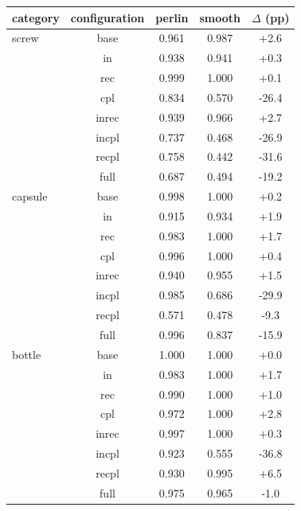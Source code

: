\setlength{\tabcolsep}{3pt}
\begin{tabular}{@{}lcccc@{}}
\toprule
category & configuration & perlin & smooth & $\Delta$ (pp) \\
\midrule
screw & base & 0.961 & 0.987 & +2.6 \\
 & in & 0.938 & 0.941 & +0.3 \\
 & rec & 0.999 & 1.000 & +0.1 \\
 & cpl & 0.834 & 0.570 & -26.4 \\
 & inrec & 0.939 & 0.966 & +2.7 \\
 & incpl & 0.737 & 0.468 & -26.9 \\
 & recpl & 0.758 & 0.442 & -31.6 \\
 & full & 0.687 & 0.494 & -19.2 \\
capsule & base & 0.998 & 1.000 & +0.2 \\
 & in & 0.915 & 0.934 & +1.9 \\
 & rec & 0.983 & 1.000 & +1.7 \\
 & cpl & 0.996 & 1.000 & +0.4 \\
 & inrec & 0.940 & 0.955 & +1.5 \\
 & incpl & 0.985 & 0.686 & -29.9 \\
 & recpl & 0.571 & 0.478 & -9.3 \\
 & full & 0.996 & 0.837 & -15.9 \\
bottle & base & 1.000 & 1.000 & +0.0 \\
 & in & 0.983 & 1.000 & +1.7 \\
 & rec & 0.990 & 1.000 & +1.0 \\
 & cpl & 0.972 & 1.000 & +2.8 \\
 & inrec & 0.997 & 1.000 & +0.3 \\
 & incpl & 0.923 & 0.555 & -36.8 \\
 & recpl & 0.930 & 0.995 & +6.5 \\
 & full & 0.975 & 0.965 & -1.0 \\
\bottomrule
\end{tabular}

